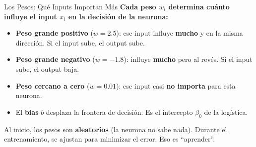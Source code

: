\documentclass[aspectratio=169, 11pt]{beamer}
\begin{document}
\begin{frame}{Los Pesos: Qu\'e Inputs Importan M\'as}
  \vspace{-4pt}
  {\footnotesize\color{arcaDark}\bfseries
    Cada peso $w_i$ determina cu\'anto influye el input $x_i$
    en la decisi\'on de la neurona:}

  \vspace{6pt}
  {\footnotesize
  \begin{itemize}\setlength{\itemsep}{5pt}
    \item[{\color{arcaRed}\scriptsize\faArrowRight}]
      \textbf{Peso grande positivo} ($w = 2.5$): ese input
      influye \textbf{mucho} y en la misma direcci\'on.
      Si el input sube, el output sube.
    \item[{\color{codeBlue}\scriptsize\faArrowRight}]
      \textbf{Peso grande negativo} ($w = -1.8$): influye
      \textbf{mucho} pero al rev\'es. Si el input sube, el output baja.
    \item[{\color{textMuted}\scriptsize\faArrowRight}]
      \textbf{Peso cercano a cero} ($w = 0.01$): ese input
      casi \textbf{no importa} para esta neurona.
    \item[{\color{codeGreen}\scriptsize\faArrowRight}]
      El \textbf{bias} $b$ desplaza la frontera de decisi\'on.
      Es el intercepto $\beta_0$ de la log\'istica.
  \end{itemize}
  }

  \vspace{4pt}
  {\scriptsize\color{textMuted}
    \faLightbulb\hspace{4pt} Al inicio, los pesos son \textbf{aleatorios}
    (la neurona no sabe nada). Durante el entrenamiento, se ajustan
    para minimizar el error. Eso es ``aprender''.}
\end{frame}
\end{document}
